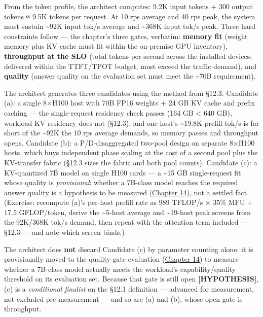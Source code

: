 From the token profile, the architect computes: 9.2K input tokens + 300
output tokens ≈ 9.5K tokens per request. At 10 rps average and 40 rps
peak, the system must sustain \textasciitilde92K input tok/s average and
\textasciitilde368K input tok/s peak. Three hard constraints follow ---
the chapter's three gates, verbatim: \textbf{memory fit} (weight memory
plus KV cache must fit within the on-premise GPU inventory),
\textbf{throughput at the SLO} (total tokens-per-second across the
installed devices, delivered within the TTFT/TPOT budget, must exceed
the traffic demand), and \textbf{quality} (answer quality on the
evaluation set must meet the \textasciitilde70B requirement).

The architect generates three candidates using the method from §12.3.
Candidate (a): a single 8×H100 host with 70B FP16 weights + 24 GB KV
cache and prefix caching --- the single-request residency check passes
(164 GB \textless{} 640 GB), workload KV residency does not (§12.3), and
one host's \textasciitilde19.8K prefill tok/s is far short of the
\textasciitilde92K the 10 rps average demands, so memory passes and
throughput opens. Candidate (b): a P/D-disaggregated two-pool design on
separate 8×H100 hosts, which buys independent phase scaling at the cost
of a second pool plus the KV-transfer fabric (§12.3 sizes the fabric and
both pool counts). Candidate (c): a KV-quantized 7B model on single H100
cards --- a \textasciitilde15 GB single-request fit whose quality is
\emph{provisional}: whether a 7B-class model reaches the required answer
quality is a hypothesis to be measured (\hyperref[chap:14]{Chapter 14}), not a settled fact.
(Exercise: recompute (a)'s per-host prefill rate as 989 TFLOP/s × 35\%
MFU ÷ 17.5 GFLOP/token, derive the \textasciitilde5-host average and
\textasciitilde19-host peak screens from the 92K/368K tok/s demand, then
repeat with the attention term included --- §12.3 --- and note which
screen binds.)

The architect does \textbf{not} discard Candidate (c) by parameter
counting alone: it is provisionally moved to the quality-gate evaluation
(\hyperref[chap:14]{Chapter 14}) to measure whether a 7B-class model actually meets the
workload's capability/quality threshold on its evaluation set. Because
that gate is still open \textbf{\mbox{{[}HYPOTHESIS{]}}}, (c) is a
\emph{conditional finalist} on the §12.1 definition --- advanced for
measurement, not excluded pre-measurement --- and so are (a) and (b),
whose open gate is throughput.

